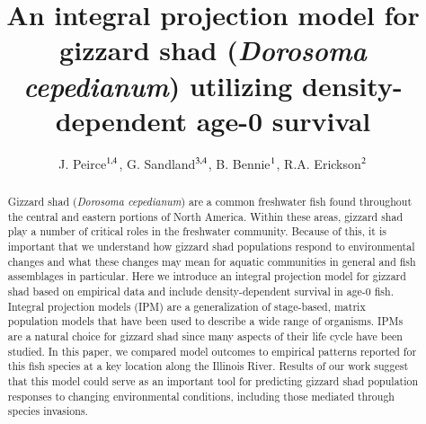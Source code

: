 \documentclass[preprint,review,12pt,authoryear]{elsarticle}
\begin{document}
\linenumbers
\begin{frontmatter}


\title{An integral projection model for gizzard shad (\emph{Dorosoma cepedianum}) utilizing density-dependent age-0 survival}

\author{ J. Peirce$^{\rm 1,4}$,  G.  Sandland$^{\rm 3,4}$, B. Bennie$^{\rm 1}$, R.A. Erickson$^{\rm 2}$}
\address{
${\rm 1}$ University of Wisconsin - La Crosse, Mathematics \& Statistics Department\\ 
${\rm 2}$ U.S.G.S. Upper Mississippi Environmental Science Center\\ 
${\rm 3}$ University of Wisconsin - La Crosse, Biology Department\\
${\rm 4}$ River Studies Center} 

\begin{abstract}
Gizzard shad (\emph{Dorosoma cepedianum}) are a common freshwater fish found throughout the central and eastern portions of North America. 
Within these areas, gizzard shad play a number of critical roles in the freshwater community. 
Because of this, it is important that we understand how gizzard shad populations respond to environmental changes and what these changes may mean for aquatic communities in general and fish assemblages in particular. 
Here we introduce an integral projection model for gizzard shad based on empirical data and include density-dependent survival in age-0 fish. 
Integral projection models (IPM) are a generalization of stage-based, matrix population models that have been used to describe a wide range of organisms. 
IPMs are a natural choice for gizzard shad since many aspects of their life cycle have been studied. 
In this paper, we compared model outcomes to empirical patterns reported for this fish species at a key location along the Illinois River. 
Results of our work suggest that this model could serve as an important tool for predicting gizzard shad population responses to changing environmental conditions, including those mediated through species invasions.
\end{abstract}

\begin{graphicalabstract}
\begin{figure}
    \begin{center}
\begin{tikzpicture}[->,>=stealth',shorten >=1pt,auto,node distance=3cm,
  thick,
  main node/.style={rectangle,draw},
  box/.style = {draw=gray, very thick,
                            minimum height=11mm, text width=11mm, 
                            align=center},]
                              

\end{tikzpicture}
\end{center}
\end{figure}
\end{graphicalabstract}
\end{frontmatter}
\end{document}
